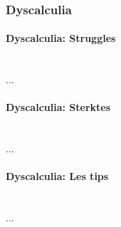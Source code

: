             \subsubsection{Dyscalculia}
            
                \paragraph{Dyscalculia: Struggles}\\
                    ...
                
                \bigskip
                \noindent\paragraph{Dyscalculia: Sterktes}\\
                    ... 
                    
                \bigskip
                \noindent\paragraph{Dyscalculia: Les tips}\\
                    ...
